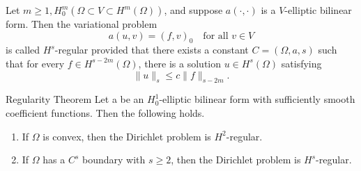 \begin{defn}
    Let $m\geq 1, H^m_0(\Omega\subset V\subset H^m(\Omega))$, and suppose $a(\cdot,\cdot)$ is a $V$-elliptic bilinear form. 
    Then the variational problem
    \begin{equation}
        a(u,v) = {(f,v)}_0\quad \text{for all } v\in V
    \end{equation}
    is called $H^s$-regular provided that there exists a constant $C=(\Omega,a,s)$ such that for every  $f\in H^{s-2m}(\Omega)$,
    there is a solution $u\in H^s(\Omega)$ satisfying
    \begin{equation}
        \|u\|_s\leq c\|f\|_{s-2m}.
    \end{equation}\label{defn:7.1}
\end{defn}

\begin{thmx}{Regularity Theorem}
    Let a be an $H^1_0$-elliptic bilinear form with sufficiently smooth coefficient functions. Then the following holds. 
    \begin{enumerate}
        \item If $\Omega$ is convex, then the Dirichlet problem is $H^2$-regular. 
        \item If $\Omega$ has a $C^s$ boundary with $s\geq 2$, then the Dirichlet problem is $H^s$-regular.
    \end{enumerate}
\end{thmx}

